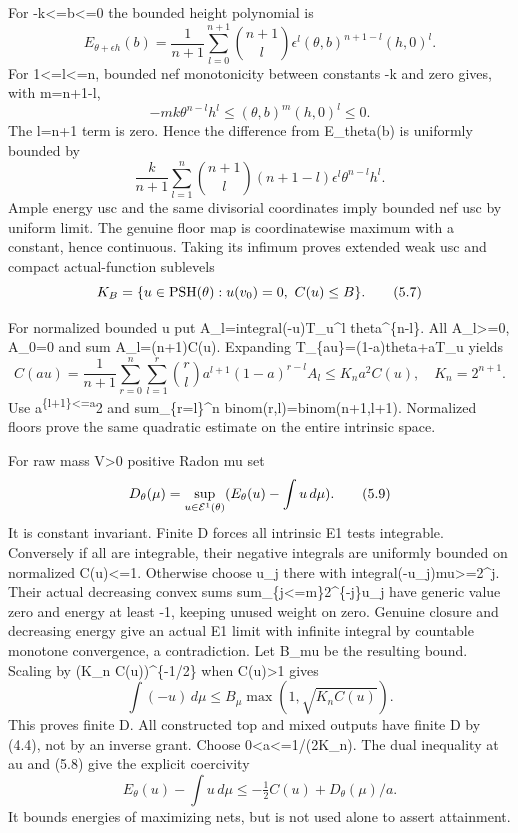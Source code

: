 \documentclass[
  10pt,
]{article}
\begin{document}
For -k\textless=b\textless=0 the bounded height polynomial is \[
 E_{\theta+\epsilon h}(b)=\frac1{n+1}\sum_{l=0}^{n+1}\binom{n+1}l
 \epsilon^l(\theta,b)^{n+1-l}(h,0)^l.
\] For 1\textless=l\textless=n, bounded nef monotonicity between
constants -k and zero gives, with m=n+1-l, \[
 -mk\theta^{n-l}h^l\le(\theta,b)^m(h,0)^l\le0.                          \tag{5.5}
\] The l=n+1 term is zero. Hence the difference from E\_theta(b) is
uniformly bounded by \[
 \frac{k}{n+1}\sum_{l=1}^n\binom{n+1}l(n+1-l)\epsilon^l\theta^{n-l}h^l. \tag{5.6}
\] Ample energy usc and the same divisorial coordinates imply bounded
nef usc by uniform limit. The genuine floor map is coordinatewise
maximum with a constant, hence continuous. Taking its infimum proves
extended weak usc and compact actual-function sublevels \[
 K_B=\{u\in{\rm PSH}(\theta):u(v_0)=0,\ C(u)\le B\}.                     \tag{5.7}
\]

For normalized bounded u put A\_l=integral(-u)T\_u\^{}l
theta\^{}\{n-l\}. All A\_l\textgreater=0, A\_0=0 and sum A\_l=(n+1)C(u).
Expanding T\_\{au\}=(1-a)theta+aT\_u yields \[
 C(au)=\frac1{n+1}\sum_{r=0}^n\sum_{l=1}^r
 \binom rl a^{l+1}(1-a)^{r-l}A_l\le K_n a^2C(u),\quad K_n=2^{n+1}.       \tag{5.8}
\] Use a\textsuperscript{\{l+1\}\textless=a}2 and sum\_\{r=l\}\^{}n
binom(r,l)=binom(n+1,l+1). Normalized floors prove the same quadratic
estimate on the entire intrinsic space.

For raw mass V\textgreater0 positive Radon mu set \[
 D_\theta(\mu)=\sup_{u\in{\cal E}^1(\theta)}(E_\theta(u)-\int u\,d\mu).    \tag{5.9}
\] It is constant invariant. Finite D forces all intrinsic E1 tests
integrable. Conversely if all are integrable, their negative integrals
are uniformly bounded on normalized C(u)\textless=1. Otherwise choose
u\_j there with integral(-u\_j)mu\textgreater=2\^{}j. Their actual
decreasing convex sums sum\_\{j\textless=m\}2\^{}\{-j\}u\_j have generic
value zero and energy at least -1, keeping unused weight on zero.
Genuine closure and decreasing energy give an actual E1 limit with
infinite integral by countable monotone convergence, a contradiction.
Let B\_mu be the resulting bound. Scaling by (K\_n C(u))\^{}\{-1/2\}
when C(u)\textgreater1 gives \[
 \int(-u)\,d\mu\le B_\mu\max(1,\sqrt{K_n C(u)}).                         \tag{5.10}
\] This proves finite D. All constructed top and mixed outputs have
finite D by (4.4), not by an inverse grant. Choose
0\textless a\textless=1/(2K\_n). The dual inequality at au and (5.8)
give the explicit coercivity \[
 E_\theta(u)-\int u\,d\mu\le-\tfrac12 C(u)+D_\theta(\mu)/a.               \tag{5.11}
\] It bounds energies of maximizing nets, but is not used alone to
assert attainment.
\end{document}
